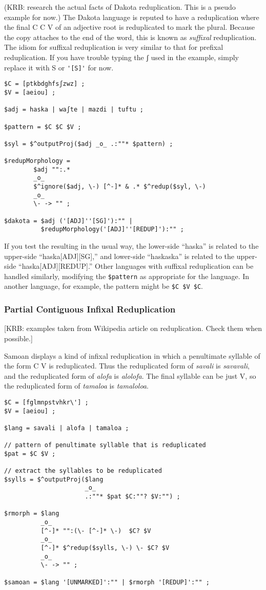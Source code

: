 (KRB:  research the actual facts of Dakota reduplication.  This is a pseudo example for now.)
The Dakota language is reputed to have a reduplication where the final C C V of an
adjective root is reduplicated to mark the plural.  Because the copy attaches to the end of
the word, this is known as \emph{suffixal} reduplication.   The idiom for suffixal
reduplication is very similar to that for prefixal reduplication.  If you have trouble
typing the ʃ used in the example, simply replace it with S or \verb!'[S]'! for now.

\begin{Verbatim}
$C = [ptkbdghfsʃzwz] ;
$V = [aeiou] ;

$adj = haska | waʃte | mazdi | tuftu ;

$pattern = $C $C $V ;

$syl = $^outputProj($adj _o_ .:""* $pattern) ;

$redupMorphology = 
        $adj "":.*
        _o_
        $^ignore($adj, \-) [^-]* & .* $^redup($syl, \-)
        _o_
        \- -> "" ;

$dakota = $adj ('[ADJ]''[SG]'):"" |
          $redupMorphology('[ADJ]''[REDUP]'):"" ;
\end{Verbatim}

If you test the resulting \fst{} in the usual way, the lower-side ``haska'' is related to the
upper-side ``haska[ADJ][SG],'' and lower-side ``haskaska'' is related to the upper-side
``haska[ADJ][REDUP].''  Other languages with suffixal reduplication can be handled similarly,
modifying the \verb!$pattern! as appropriate for the language.  In another language, for example,
the pattern might be \verb!$C $V $C!.

\subsubsection{Partial Contiguous Infixal Reduplication}

[KRB:  examples taken from Wikipedia article on reduplication.  Check
them when possible.]

Samoan displays a kind of infixal reduplication in which a penultimate
syllable of the form C V is reduplicated.  Thus the reduplicated form of
\emph{savali} is \emph{savavali}, and the reduplicated form of
\emph{alofa} is \emph{alolofa}.  The final syllable can be just V, so
the reduplicated form of \emph{tamaloa} is \emph{tamaloloa}.

\begin{Verbatim}
$C = [fglmnpstvhkr\'] ;
$V = [aeiou] ;

$lang = savali | alofa | tamaloa ;

// pattern of penultimate syllable that is reduplicated
$pat = $C $V ;

// extract the syllables to be reduplicated
$sylls = $^outputProj($lang
                      _o_
                      .:""* $pat $C:""? $V:"") ;

$rmorph = $lang
          _o_
          [^-]* "":(\- [^-]* \-)  $C? $V 
          _o_
          [^-]* $^redup($sylls, \-) \- $C? $V
          _o_
          \- -> "" ;

$samoan = $lang '[UNMARKED]':"" | $rmorph '[REDUP]':"" ;
\end{Verbatim}

